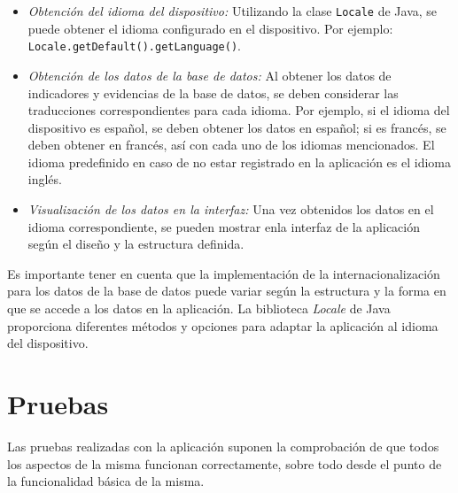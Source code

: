 \begin{itemize}
\begin{itemize}
    \item \textit{Obtención del idioma del dispositivo:} Utilizando la clase \texttt{Locale} de
    Java, se puede obtener el idioma configurado en el dispositivo. Por ejemplo:
    \texttt{Locale.getDefault().getLanguage()}.
    \item \textit{Obtención de los datos de la base de datos:} Al obtener los
    datos de indicadores y evidencias de la base de datos, se deben considerar
    las traducciones correspondientes para cada idioma. Por ejemplo, si el
    idioma del dispositivo es español, se deben obtener los datos en español; si
    es francés, se deben obtener en francés, así con cada uno de los idiomas
    mencionados. El idioma predefinido en caso de no estar registrado en la
    aplicación es el idioma inglés.
    \item \textit{Visualización de los datos en la interfaz:} Una vez obtenidos
    los datos en el idioma correspondiente, se pueden mostrar enla interfaz de
    la aplicación según el diseño y la estructura definida.
\end{itemize}
    
    Es importante tener en cuenta que la implementación de la
    internacionalización para los datos de la base de datos puede variar según
    la estructura y la forma en que se accede a los datos en la aplicación. La
    biblioteca \textit{Locale} de Java proporciona diferentes métodos y opciones para
    adaptar la aplicación al idioma del dispositivo.
    
\end{itemize}



\section{Pruebas}
Las pruebas realizadas con la aplicación suponen la comprobación de que todos
los aspectos de la misma funcionan correctamente, sobre todo desde el punto de
la funcionalidad básica de la misma. 
